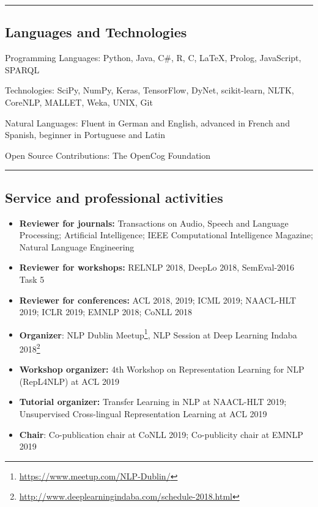 \documentclass[10pt,letterpaper]{article}
\newenvironment{indentsection}[1]%
{\begin{list}{}%
	{\setlength{\leftmargin}{#1}}%
	\item[]%
}
{\end{list}}
\begin{document}
\hrule
\vspace{-0.4em}
\subsection*{Languages and Technologies}

\begin{indentsection}{\parindent}
\begin{description*}
	\item[Programming Languages:]
	Python, Java, C\#, R, C, \LaTeX, Prolog, JavaScript, SPARQL
	\item[Technologies:]
	SciPy, NumPy, Keras, TensorFlow, DyNet, scikit-learn, NLTK, CoreNLP, MALLET, Weka, UNIX, Git
	\item[Natural Languages:]
	Fluent in German and English, advanced in French and Spanish, beginner in Portuguese and Latin	
	\item[Open Source Contributions:]
	The OpenCog Foundation
\end{description*}
\end{indentsection}

\hrule
\vspace{-0.4em}
\subsection*{Service and professional activities}

\begin{itemize}
	\parskip=0.1em
	
	\item \textbf{Reviewer for journals:} Transactions on Audio, Speech and Language Processing; Artificial Intelligence; IEEE Computational Intelligence Magazine; Natural Language Engineering
	
	\item \textbf{Reviewer for workshops:} RELNLP 2018, DeepLo 2018, SemEval-2016 Task 5
		
	\item \textbf{Reviewer for conferences:} ACL 2018, 2019; ICML 2019; NAACL-HLT 2019; ICLR 2019; EMNLP 2018; CoNLL 2018
	
	\item \textbf{Organizer}: NLP Dublin Meetup\footnote{\url{https://www.meetup.com/NLP-Dublin/}}, NLP Session at Deep Learning Indaba 2018\footnote{\url{http://www.deeplearningindaba.com/schedule-2018.html}}
	
	\item \textbf{Workshop organizer:} 4th Workshop on Representation Learning for NLP (RepL4NLP) at ACL 2019
	
	\item \textbf{Tutorial organizer:} Transfer Learning in NLP at NAACL-HLT 2019; Unsupervised Cross-lingual Representation Learning at ACL 2019
	
	\item \textbf{Chair}: Co-publication chair at CoNLL 2019; Co-publicity chair at EMNLP 2019

\end{itemize}
\end{document}
